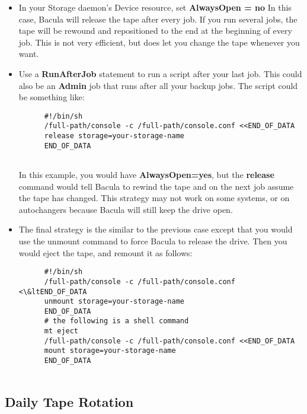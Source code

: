 \begin{itemize}
\item In your Storage daemon's Device resource, set
   {\bf AlwaysOpen = no}
   In this case, Bacula will release the tape after  every job. If you run
several jobs, the tape will be  rewound and repositioned to the end at the
beginning  of every job. This is not very efficient, but does let  you change
the tape whenever you want.  
\item Use a {\bf RunAfterJob} statement to run a script after  your last job.
   This could also be an {\bf Admin}  job that runs after all your backup jobs.
   The script could be  something like:  

\footnotesize
\begin{verbatim}
      #!/bin/sh
      /full-path/console -c /full-path/console.conf <<END_OF_DATA
      release storage=your-storage-name
      END_OF_DATA
      
\end{verbatim}
\normalsize

In this example, you would have {\bf AlwaysOpen=yes},  but the {\bf release}
command would tell Bacula to  rewind the tape and on the next job assume the
tape  has changed. This strategy may not work on some systems,  or on
autochangers because Bacula will still keep the  drive open.  
\item The final strategy is the similar to the previous  case except that you
   would use the unmount command  to force Bacula to release the drive. Then you
   would  eject the tape, and remount it as follows:  

\footnotesize
\begin{verbatim}
      #!/bin/sh
      /full-path/console -c /full-path/console.conf <\&ltEND_OF_DATA
      unmount storage=your-storage-name
      END_OF_DATA
      # the following is a shell command
      mt eject
      /full-path/console -c /full-path/console.conf <<END_OF_DATA
      mount storage=your-storage-name
      END_OF_DATA
      
\end{verbatim}
\normalsize

\end{itemize}

\label{Daily}

\subsection*{Daily Tape Rotation}

